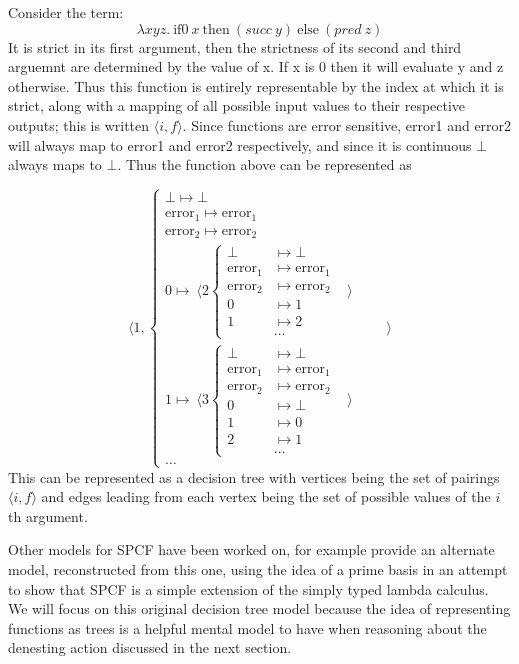 \documentclass[12pt,a4paper]{report}
\theoremstyle{definition}
\theoremstyle{remark}
\begin{document}
Consider the term:
\[\lambda xyz.\ \text{if0}\ x\ \text{then}\ (succ\ y)\ \text{else}\ (pred\ z)\]
It is strict in its first argument, then the strictness of its second and third arguemnt are determined by the value of x. If x is 0 then it will evaluate y and z otherwise. Thus this function is entirely representable by the index at which it is strict, along with a mapping of all possible input values to their respective outputs; this is written $\langle i, f \rangle$. Since functions are error sensitive, error1 and error2 will always map to error1 and error2 respectively, and since it is continuous $\bot$ always maps to $\bot$. Thus the function above can be represented as

\[\langle 1, 
\begin{cases}
    \bot \mapsto \bot\\
    \text{error}_1 \mapsto \text{error}_1\\
    \text{error}_2 \mapsto \text{error}_2\\
    0 \mapsto\ \langle 2 \begin{cases}
        \bot &\mapsto \bot\\
        \text{error}_1 &\mapsto \text{error}_1\\
        \text{error}_2 &\mapsto \text{error}_2\\
        0 &\mapsto 1\\
        1 &\mapsto 2\\
          &\dots
    \end{cases} &\rangle\\
    1 \mapsto\ \langle 3 \begin{cases}
        \bot &\mapsto \bot\\
        \text{error}_1 &\mapsto \text{error}_1\\
        \text{error}_2 &\mapsto \text{error}_2\\
        0 &\mapsto \bot\\
        1 &\mapsto 0\\
        2 &\mapsto 1\\
          &\dots
    \end{cases} &\rangle\\
    \dots
\end{cases} \quad\quad\rangle
\]
This can be represented as a decision tree with vertices being the set of pairings  $\langle i, f \rangle$ and edges leading from each vertex being the set of possible values of the $i$th argument. 

Other models for SPCF have been worked on, for example \cite{kanneganti_1993} provide an alternate model, reconstructed from this one, using the idea of a prime basis \citep{Winskel1980EventsIC} in an attempt to show that SPCF is a simple extension of the simply typed lambda calculus. We will focus on this original decision tree model because the idea of representing functions as trees is a helpful mental model to have when reasoning about the denesting action discussed in the next section.
\end{document}
